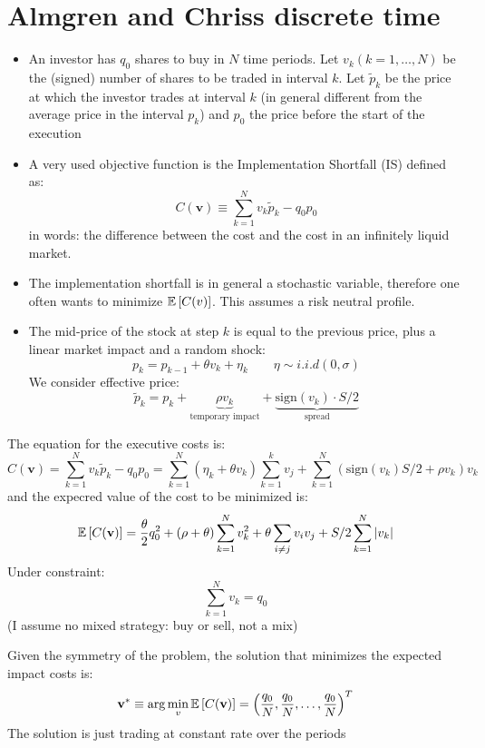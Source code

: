 \section{Almgren and Chriss discrete time}
\begin{mysetting}
	\begin{itemize}
		\item An investor has $q_0$ shares to buy in $N$ time periods. Let $v_k (k = 1,\ldots,N)$ be the
		(signed) number of shares to be traded in interval $k$. Let $\tilde{p}_k$ be the price at which the investor trades at interval $k$ (in general different from the average price in the interval $p_k$) and $p_0$ the price before the start of the execution
		\item A very used objective function is the Implementation Shortfall (IS) defined as:
		\[
		C(\textbf{v}) \equiv \sum_{k=1}^{N} v_k\tilde{p}_k -q_0p_0
		\]
		in words: the difference between the cost and the cost in an infinitely liquid market.
		\item The implementation shortfall is in general a stochastic variable, therefore one often wants to minimize $\mathbb{E}\left[C(v)\right]$. This assumes a risk neutral profile.
	\end{itemize}
\end{mysetting}
\begin{mysetting}
	\begin{itemize}
		\item The mid-price of the stock at step $k$ is equal to the previous price, plus a linear market impact and a random shock:
		\[
		p_k = p_{k-1} + \theta v_k + \eta_k \qquad \eta \sim i.i.d(0,\sigma)
		\]
We consider effective price:
\[
\tilde{p}_k = p_k + \underbrace{\rho v_k}_{\text{temporary impact}} + \underbrace{\text{sign}(v_k)\cdot S/2}_{\text{spread}}
\]
	\end{itemize}
\end{mysetting}
The equation for the executive costs is:
\[
C(\textbf{v}) = \sum_{k=1}^{N}v_k \tilde{p}_k - q_0p_0 = \sum_{k=1}^{N} (\eta_k + \theta v_k)\sum_{k=1}^{k} v_j + \sum_{k=1}^{N} (\text{sign}(v_k)S/2 + \rho v_k)v_k
\]
and the expecred value of the cost to be minimized is:
\[
\mathbb{E}\left[C(\textbf{v})\right] = \frac{\theta}{2}q^2_0 + (\rho + \theta) \sum_{k=1}^{N}v^2_k + \theta \sum_{i \neq j} v_iv_j + S/2 \sum_{k=1}^{N} |v_k|
\]
Under constraint:
\[
\sum_{k=1}^N v_k = q_0
\](I assume no mixed strategy: buy or sell, not a mix)
\begin{mytheorem}
Given the symmetry of the problem, the solution that minimizes the expected impact costs is:
\[
\textbf{v}^* \equiv \mathrm{arg} \min_v \mathbb{E}\left[C(\textbf{v})\right] = \left(\frac{q_0}{N}, \frac{q_0}{N},\ldots,\frac{q_0}{N}\right)^T
\]
The solution is just trading at constant rate over the periods
\end{mytheorem}
